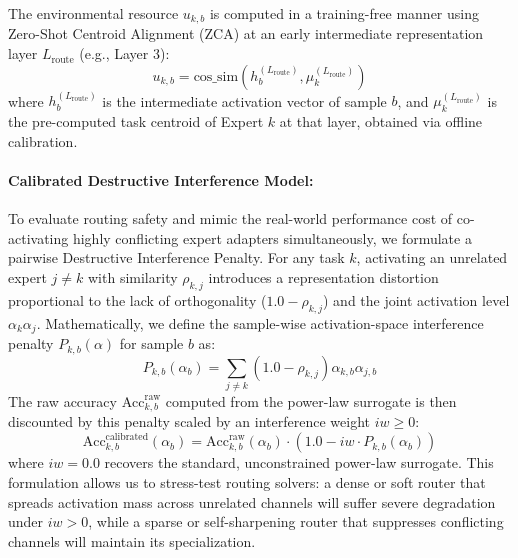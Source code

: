 The environmental resource $u_{k, b}$ is computed in a training-free manner using Zero-Shot Centroid Alignment (ZCA) at an early intermediate representation layer $L_{\text{route}}$ (e.g., Layer 3):
\begin{equation}
    u_{k, b} = \text{cos\_sim}\left(h^{(L_{\text{route}})}_b, \mu^{(L_{\text{route}})}_k\right)
\end{equation}
where $h^{(L_{\text{route}})}_b$ is the intermediate activation vector of sample $b$, and $\mu^{(L_{\text{route}})}_k$ is the pre-computed task centroid of Expert $k$ at that layer, obtained via offline calibration.

\paragraph{Calibrated Destructive Interference Model:} 
To evaluate routing safety and mimic the real-world performance cost of co-activating highly conflicting expert adapters simultaneously, we formulate a pairwise Destructive Interference Penalty. For any task $k$, activating an unrelated expert $j \neq k$ with similarity $\rho_{k, j}$ introduces a representation distortion proportional to the lack of orthogonality ($1.0 - \rho_{k, j}$) and the joint activation level $\alpha_k \alpha_j$. Mathematically, we define the sample-wise activation-space interference penalty $P_{k, b}(\alpha)$ for sample $b$ as:
\begin{equation}
    P_{k, b}(\alpha_b) = \sum_{j \neq k} \left( 1.0 - \rho_{k, j} \right) \alpha_{k, b} \alpha_{j, b}
\end{equation}
The raw accuracy $\text{Acc}_{k, b}^{\text{raw}}$ computed from the power-law surrogate is then discounted by this penalty scaled by an interference weight $iw \geq 0$:
\begin{equation}
    \label{eq:interference_calibrated}
    \text{Acc}_{k, b}^{\text{calibrated}}(\alpha_b) = \text{Acc}_{k, b}^{\text{raw}}(\alpha_b) \cdot \left( 1.0 - iw \cdot P_{k, b}(\alpha_b) \right)
\end{equation}
where $iw = 0.0$ recovers the standard, unconstrained power-law surrogate. This formulation allows us to stress-test routing solvers: a dense or soft router that spreads activation mass across unrelated channels will suffer severe degradation under $iw > 0$, while a sparse or self-sharpening router that suppresses conflicting channels will maintain its specialization.

